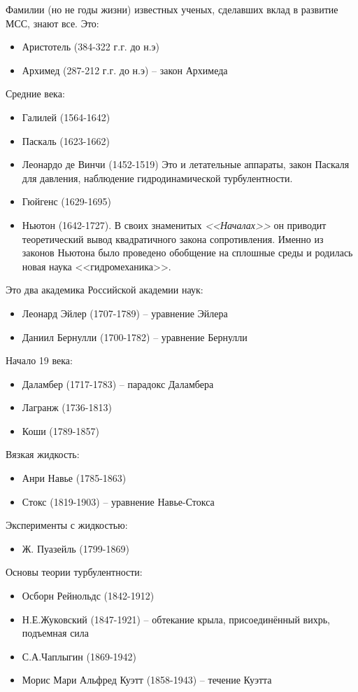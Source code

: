 Фамилии (но не годы жизни) известных ученых, сделавших вклад в развитие МСС, знают все. Это:
\begin{itemize}
	\setlength\itemsep{-0.4em}
	\item Аристотель (384-322 г.г. до н.э)
	\item Архимед (287-212 г.г. до н.э) -- закон Архимеда
\end{itemize}
	Средние века:
\begin{itemize}
	\setlength\itemsep{-0.4em}
	\item Галилей (1564-1642)
	\item Паскаль (1623-1662) 
	\item Леонардо де Винчи (1452-1519)
	Это и летательные аппараты, закон Паскаля для давления, наблюдение гидродинамической турбулентности.
	\item Гюйгенс (1629-1695)
	\item Ньютон (1642-1727). В своих знаменитых \emph{<<Началах>>} он приводит теоретический вывод квадратичного закона сопротивления. Именно из законов Ньютона было проведено обобщение на сплошные среды и родилась новая наука <<гидромеханика>>.
\end{itemize}
Это два академика Российской академии наук:
\begin{itemize}
	\setlength\itemsep{-0.4em}
	\item Леонард Эйлер (1707-1789) -- уравнение Эйлера
	\item Даниил Бернулли (1700-1782) --  уравнение Бернулли
\end{itemize}
Начало 19 века:
\begin{itemize}
	\setlength\itemsep{-0.4em}
	\item Даламбер (1717-1783) -- парадокс Даламбера
	\item Лагранж (1736-1813)
	\item Коши (1789-1857)
\end{itemize}
Вязкая жидкость:
\begin{itemize}
	\setlength\itemsep{-0.4em}
	\item Анри Навье  (1785-1863)
	\item Стокс (1819-1903) -- уравнение Навье-Стокса
\end{itemize}
Эксперименты с жидкостью:
\begin{itemize}
	\setlength\itemsep{-0.4em}
	\item Ж. Пуазейль (1799-1869)
\end{itemize}
Основы теории турбулентности:
\begin{itemize}
	\setlength\itemsep{-0.4em}
	\item Осборн Рейнольдс (1842-1912)
	\item Н.Е.Жуковский (1847-1921) -- обтекание крыла, присоединённый вихрь, подъемная сила
	\item С.А.Чаплыгин (1869-1942)
	\item Морис Мари Альфред Куэтт  (1858-1943) -- течение Куэтта
\end{itemize}
